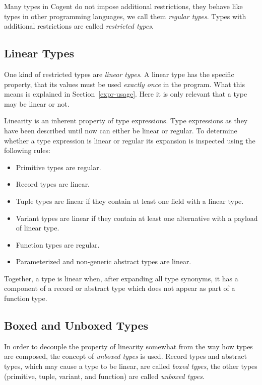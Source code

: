 \documentclass[a4paper]{report}
\newcommand{\cogent}{Cogent\xspace}
\begin{document}
Many types in \cogent do not impose additional restrictions, they behave like types in other programming languages,
we call them \textit{regular types}. Types with additional restrictions are called \textit{restricted types}.

\subsection{Linear Types}

One kind of restricted types are \textit{linear types}. A linear type has the specific property, that its values must 
be used \textit{exactly once} in the program. What this means is explained in Section~\ref{expr-usage}. Here it is 
only relevant that a type may be linear or not.

Linearity is an inherent property of type expressions. Type expressions as they have been described until now can either
be linear or regular. To determine whether a type expression is linear or regular 
its expansion is inspected using the following rules:
\begin{itemize}
\item Primitive types are regular.
\item Record types are linear.
\item Tuple types are linear if they contain at least one field with a linear type.
\item Variant types are linear if they contain at least one alternative with a payload of linear type.
\item Function types are regular.
\item Parameterized and non-generic abstract types are linear.
\end{itemize}

Together, a type is linear when, after expanding all type synonyms, it has a component of a record or abstract type
which does not appear as part of a function type.

\subsection{Boxed and Unboxed Types}

In order to decouple the property of linearity somewhat from the way how types are composed, the concept of 
\textit{unboxed types} is used. Record types and abstract types, which may cause a type to be linear, are
called \textit{boxed types}, the other types (primitive, tuple, variant, and function) are called \textit{unboxed types}.
\end{document}
